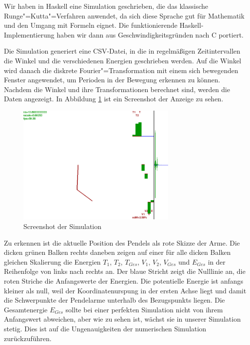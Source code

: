 Wir haben in Haskell eine Simulation geschrieben, die das klassische Runge"=Kutta"=Verfahren anwendet, da sich diese Sprache gut für Mathematik und den Umgang mit Formeln eignet. Die funktionierende Haskell-Implementierung haben wir dann aus Geschwindigkeitsgründen nach C portiert.

Die Simulation generiert eine CSV-Datei, in die in regelmäßigen Zeitintervallen die Winkel und die verschiedenen Energien geschrieben werden.
Auf die Winkel wird danach die diskrete Fourier"=Transformation mit einem sich bewegenden Fenster angewendet, um Perioden in der Bewegung erkennen zu können.
Nachdem die Winkel und ihre Transformationen berechnet sind, werden die Daten angezeigt.
In Abbildung \ref{fig:hssim} ist ein Screenshot der Anzeige zu sehen.

\begin{figure}[bht]
  \centering
  \includegraphics[width=0.7\textwidth]{images/haskell_simulation_fwindow1000_whitebg_cropped.png}
  \caption{Screenshot der Simulation}
  \label{fig:hssim}
\end{figure}

Zu erkennen ist die aktuelle Position des Pendels als rote Skizze der Arme.
Die dicken grünen Balken rechts daneben zeigen auf einer für alle dicken Balken gleichen Skalierung die Energien $T_1$, $T_2$, $T_{Ges}$, $V_1$, $V_2$, $V_{Ges}$ und $E_{Ges}$ in der Reihenfolge von links nach rechts an.
Der blaue Stricht zeigt die Nulllinie an, die roten Striche die Anfangswerte der Energien.
Die potentielle Energie ist anfangs kleiner als null, weil der Koordinatenurspung in der ersten Achse liegt und damit die Schwerpunkte der Pendelarme unterhalb des Bezugspunkts liegen.
Die Gesamtenergie $E_{Ges}$ sollte bei einer perfekten Simulation nicht von ihrem Anfangswert abweichen, aber wie zu sehen ist, wächst sie in unserer Simulation stetig.
Dies ist auf die Ungenauigkeiten der numerischen Simulation zurückzuführen.

